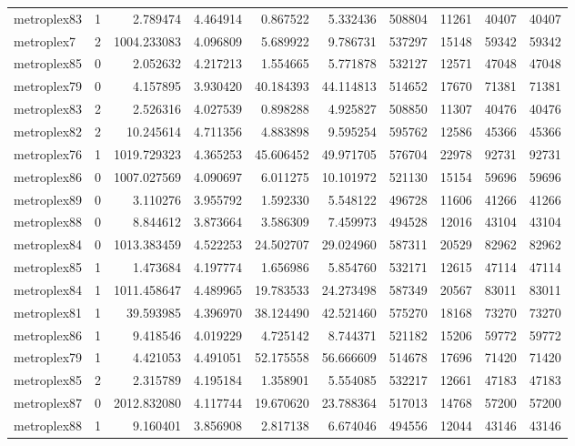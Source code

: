 \documentclass[../../../thesis.tex]{subfiles}
\begin{document}
\begin{longtable}{|l|r|r|r|r|r|r|r|r|r|}
metroplex83 & 1 & 2.789474 & 4.464914 & 0.867522 & 5.332436 & 508804 & 11261 & 40407 & 40407 \\
metroplex7 & 2 & 1004.233083 & 4.096809 & 5.689922 & 9.786731 & 537297 & 15148 & 59342 & 59342 \\
metroplex85 & 0 & 2.052632 & 4.217213 & 1.554665 & 5.771878 & 532127 & 12571 & 47048 & 47048 \\
metroplex79 & 0 & 4.157895 & 3.930420 & 40.184393 & 44.114813 & 514652 & 17670 & 71381 & 71381 \\
metroplex83 & 2 & 2.526316 & 4.027539 & 0.898288 & 4.925827 & 508850 & 11307 & 40476 & 40476 \\
metroplex82 & 2 & 10.245614 & 4.711356 & 4.883898 & 9.595254 & 595762 & 12586 & 45366 & 45366 \\
metroplex76 & 1 & 1019.729323 & 4.365253 & 45.606452 & 49.971705 & 576704 & 22978 & 92731 & 92731 \\
metroplex86 & 0 & 1007.027569 & 4.090697 & 6.011275 & 10.101972 & 521130 & 15154 & 59696 & 59696 \\
metroplex89 & 0 & 3.110276 & 3.955792 & 1.592330 & 5.548122 & 496728 & 11606 & 41266 & 41266 \\
metroplex88 & 0 & 8.844612 & 3.873664 & 3.586309 & 7.459973 & 494528 & 12016 & 43104 & 43104 \\
metroplex84 & 0 & 1013.383459 & 4.522253 & 24.502707 & 29.024960 & 587311 & 20529 & 82962 & 82962 \\
metroplex85 & 1 & 1.473684 & 4.197774 & 1.656986 & 5.854760 & 532171 & 12615 & 47114 & 47114 \\
metroplex84 & 1 & 1011.458647 & 4.489965 & 19.783533 & 24.273498 & 587349 & 20567 & 83011 & 83011 \\
metroplex81 & 1 & 39.593985 & 4.396970 & 38.124490 & 42.521460 & 575270 & 18168 & 73270 & 73270 \\
metroplex86 & 1 & 9.418546 & 4.019229 & 4.725142 & 8.744371 & 521182 & 15206 & 59772 & 59772 \\
metroplex79 & 1 & 4.421053 & 4.491051 & 52.175558 & 56.666609 & 514678 & 17696 & 71420 & 71420 \\
metroplex85 & 2 & 2.315789 & 4.195184 & 1.358901 & 5.554085 & 532217 & 12661 & 47183 & 47183 \\
metroplex87 & 0 & 2012.832080 & 4.117744 & 19.670620 & 23.788364 & 517013 & 14768 & 57200 & 57200 \\
metroplex88 & 1 & 9.160401 & 3.856908 & 2.817138 & 6.674046 & 494556 & 12044 & 43146 & 43146 \\

\end{longtable}
\end{document}
